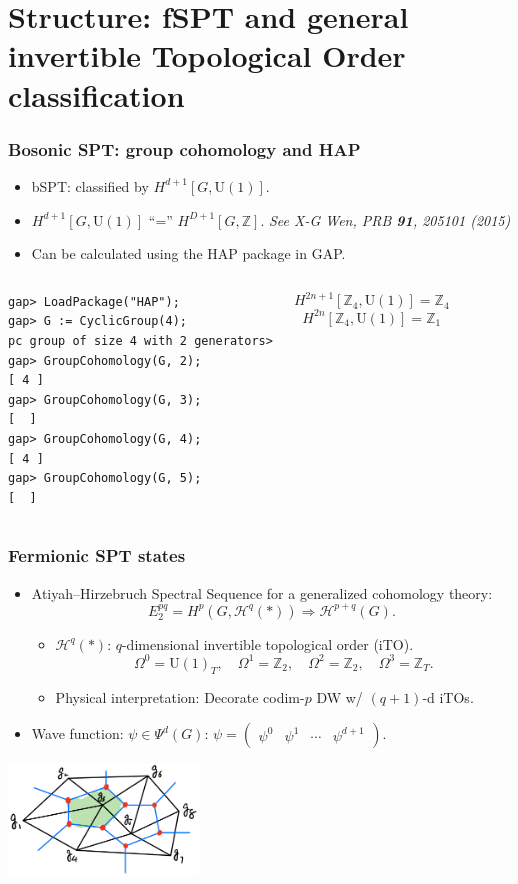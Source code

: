 \documentclass[xcolor=table, aspectratio=169]{beamer}
\newcommand{\uone}{\mathrm U(1)}
\begin{document}
\section{Structure: fSPT and general invertible Topological Order classification}

\begin{frame}[fragile]
	\frametitle{Bosonic SPT: group cohomology and HAP}
	\begin{itemize}
		\item bSPT: classified by $H^{d+1}[G,\uone]$.
		\item $H^{d+1}[G,\uone]$ ``='' $H^{D+1}[G,\mathbb Z]$. \emph{See X-G Wen, PRB \textbf{91}, 205101 (2015)}
                \item Can be calculated using the HAP package in GAP.
	\end{itemize}
	\begin{columns}
	\begin{lstlisting}[basicstyle=\footnotesize]
gap> LoadPackage("HAP");
gap> G := CyclicGroup(4);
pc group of size 4 with 2 generators>
gap> GroupCohomology(G, 2);
[ 4 ]
gap> GroupCohomology(G, 3);
[  ]
gap> GroupCohomology(G, 4);
[ 4 ]
gap> GroupCohomology(G, 5);
[  ]
\end{lstlisting}
	\[H^{2n+1}[\mathbb Z_4,\uone] = \mathbb Z_4\]
	\[H^{2n}[\mathbb Z_4,\uone] = \mathbb Z_1\]
	\end{columns}
\end{frame}

\begin{frame}
  \frametitle{Fermionic SPT states}
  \begin{itemize}
  \item Atiyah–Hirzebruch Spectral Sequence for a generalized cohomology theory:
    \[E_2^{pq} = H^p(G, \mathcal H^q(*)) \Rightarrow \mathcal H^{p+q}(G).\]
    \begin{itemize}
    \item $\mathcal H^q(*)$: $q$-dimensional invertible topological order (iTO).
    \[\Omega^0=\uone_T,\quad\Omega^1=\mathbb Z_2,\quad\Omega^2=\mathbb Z_2,\quad\Omega^3=\mathbb Z_T.\]
    \item Physical interpretation: Decorate codim-$p$ DW w/ $(q+1)$-d iTOs.
    \end{itemize}
  \item Wave function: $\psi\in \Psi^d(G)$: $\psi=\begin{pmatrix}\psi^0&\psi^1&\cdots&\psi^{d+1}\end{pmatrix}$.
  \end{itemize}
  \begin{center}
    \includegraphics[height=3cm]{decoration}
  \end{center}
\end{frame}
\end{document}
